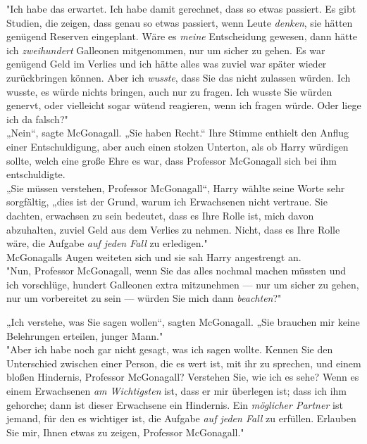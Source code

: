 {"Ich habe das erwartet. Ich habe damit gerechnet, dass so etwas passiert. Es gibt Studien, die zeigen, dass genau so etwas passiert, wenn Leute \emph{denken}, sie hätten genügend Reserven eingeplant. Wäre es \emph{meine} Entscheidung gewesen, dann hätte ich \emph{zweihundert} Galleonen mitgenommen, nur um sicher zu gehen. Es war genügend Geld im Verlies und ich hätte alles was zuviel war später wieder zurückbringen können. Aber ich \emph{wusste}, dass Sie das nicht zulassen würden. Ich wusste, es würde nichts bringen, auch nur zu fragen. Ich wusste Sie würden genervt, oder vielleicht sogar wütend reagieren, wenn ich fragen würde. Oder liege ich da falsch?"\\ „Nein“, sagte McGonagall. „Sie haben Recht.“ Ihre Stimme enthielt den Anflug einer Entschuldigung, aber auch einen stolzen Unterton, als ob Harry würdigen sollte, welch eine große Ehre es war, dass Professor McGonagall sich bei ihm entschuldigte.\\ „Sie müssen verstehen, Professor McGonagall“, Harry wählte seine Worte sehr sorgfältig, „dies ist der Grund, warum ich Erwachsenen nicht vertraue. Sie dachten, erwachsen zu sein bedeutet, dass es Ihre Rolle ist, mich davon abzuhalten, zuviel Geld aus dem Verlies zu nehmen. Nicht, dass es Ihre Rolle wäre, die Aufgabe \emph{auf jeden Fall} zu erledigen."\\ McGonagalls Augen weiteten sich und sie sah Harry angestrengt an.\\ "Nun, Professor McGonagall, wenn Sie das alles nochmal machen müssten und ich vorschlüge, hundert Galleonen extra mitzunehmen --- nur um sicher zu gehen, nur um vorbereitet zu sein --- würden Sie mich dann \emph{beachten}?"

„Ich verstehe, was Sie sagen wollen“, sagten McGonagall. „Sie brauchen mir keine Belehrungen erteilen, junger Mann."\\ "Aber ich habe noch gar nicht gesagt, was ich sagen wollte. Kennen Sie den Unterschied zwischen einer Person, die es wert ist, mit ihr zu sprechen, und einem bloßen Hindernis, Professor McGonagall? Verstehen Sie, wie ich es sehe? Wenn es einem Erwachsenen \emph{am Wichtigsten} ist, dass er mir überlegen ist; dass ich ihm gehorche; dann ist dieser Erwachsene ein Hindernis. Ein \emph{möglicher Partner} ist jemand, für den es wichtiger ist, die Aufgabe \emph{auf jeden Fall} zu erfüllen. Erlauben Sie mir, Ihnen etwas zu zeigen, Professor McGonagall."

}
